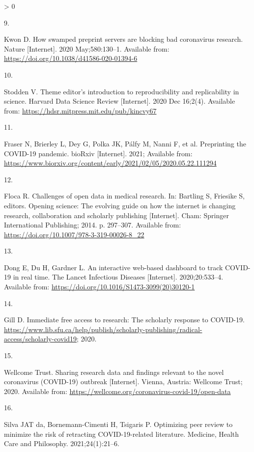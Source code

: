 \documentclass[
]{article}
\newlength{\cslhangindent}
\newlength{\csllabelwidth}
\newenvironment{CSLReferences}[2] %
 {%
  \setlength{\parindent}{0pt}
  \ifodd #1 \everypar{\setlength{\hangindent}{\cslhangindent}}\ignorespaces\fi
  \ifnum #2 > 0
  \setlength{\parskip}{#2\baselineskip}
  \fi
 }%
 {}
\newcommand{\CSLLeftMargin}[1]{\parbox[t]{\csllabelwidth}{#1}}
\newcommand{\CSLRightInline}[1]{\parbox[t]{\linewidth - \csllabelwidth}{#1}\break}
\begin{document}
\begin{CSLReferences}{0}{0}
\leavevmode\hypertarget{ref-kwon2020}{}%
\CSLLeftMargin{9. }
\CSLRightInline{Kwon D. How swamped preprint servers are blocking bad coronavirus research. Nature {[}Internet{]}. 2020 May;580:130--1. Available from: \url{https://doi.org/10.1038/d41586-020-01394-6}}

\leavevmode\hypertarget{ref-Stodden2020Theme}{}%
\CSLLeftMargin{10. }
\CSLRightInline{Stodden V. Theme editor's introduction to reproducibility and replicability in science. Harvard Data Science Review {[}Internet{]}. 2020 Dec 16;2(4). Available from: \url{https://hdsr.mitpress.mit.edu/pub/kincvy67}}

\leavevmode\hypertarget{ref-citeFraser}{}%
\CSLLeftMargin{11. }
\CSLRightInline{Fraser N, Brierley L, Dey G, Polka JK, Pálfy M, Nanni F, et al. Preprinting the COVID-19 pandemic. bioRxiv {[}Internet{]}. 2021; Available from: \url{https://www.biorxiv.org/content/early/2021/02/05/2020.05.22.111294}}

\leavevmode\hypertarget{ref-Floca2014}{}%
\CSLLeftMargin{12. }
\CSLRightInline{Floca R. Challenges of open data in medical research. In: Bartling S, Friesike S, editors. Opening science: The evolving guide on how the internet is changing research, collaboration and scholarly publishing {[}Internet{]}. Cham: Springer International Publishing; 2014. p. 297--307. Available from: \url{https://doi.org/10.1007/978-3-319-00026-8_22}}

\leavevmode\hypertarget{ref-citeCSSE}{}%
\CSLLeftMargin{13. }
\CSLRightInline{Dong E, Du H, Gardner L. An interactive web-based dashboard to track COVID-19 in real time. The Lancet Infectious Diseases {[}Internet{]}. 2020;20:533--4. Available from: \url{https://doi.org/10.1016/S1473-3099(20)30120-1}}

\leavevmode\hypertarget{ref-gill2020}{}%
\CSLLeftMargin{14. }
\CSLRightInline{Gill D. Immediate free access to research: The scholarly response to COVID-19. \url{https://www.lib.sfu.ca/help/publish/scholarly-publishing/radical-access/scholarly-covid19}; 2020. }

\leavevmode\hypertarget{ref-citeWellcome}{}%
\CSLLeftMargin{15. }
\CSLRightInline{Wellcome Trust. Sharing research data and findings relevant to the novel coronavirus (COVID-19) outbreak {[}Internet{]}. Vienna, Austria: Wellcome Trust; 2020. Available from: \url{https://wellcome.org/coronavirus-covid-19/open-data}}

\leavevmode\hypertarget{ref-da2021optimizing}{}%
\CSLLeftMargin{16. }
\CSLRightInline{Silva JAT da, Bornemann-Cimenti H, Tsigaris P. Optimizing peer review to minimize the risk of retracting COVID-19-related literature. Medicine, Health Care and Philosophy. 2021;24(1):21--6. }


\end{CSLReferences}
\end{document}
